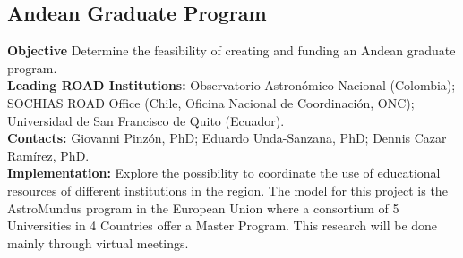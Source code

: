 


\subsection{Andean Graduate Program}
\textbf{Objective} Determine the feasibility of creating and funding an Andean graduate program.
\\
\textbf{Leading ROAD Institutions:} Observatorio Astronómico Nacional (Colombia); SOCHIAS ROAD Office (Chile, Oficina Nacional de Coordinación, ONC); Universidad de San Francisco de Quito (Ecuador).
\\
\textbf{Contacts:} Giovanni Pinzón, PhD; Eduardo Unda-Sanzana, PhD; Dennis Cazar Ramírez, PhD.  
\\
\textbf{Implementation:} Explore the possibility to coordinate the use of educational resources of different institutions in the region. The model for this project is the AstroMundus program in the European Union where a consortium of 5 Universities in 4 Countries offer a Master Program. This research will be done mainly through virtual meetings. 


